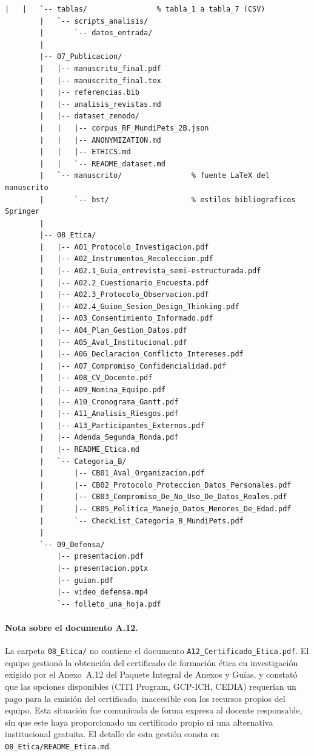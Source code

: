 \documentclass[journal,onecolumn]{IEEEtran}
\begin{document}
\begin{lstlisting}[style=csharp,caption={Estructura de carpetas del repositorio MundiPets-PFC-IngReq.},label={lst:estructura_repo}]
		|   |   `-- tablas/                % tabla_1 a tabla_7 (CSV)
		|   `-- scripts_analisis/
		|       `-- datos_entrada/
		|
		|-- 07_Publicacion/
		|   |-- manuscrito_final.pdf
		|   |-- manuscrito_final.tex
		|   |-- referencias.bib
		|   |-- analisis_revistas.md
		|   |-- dataset_zenodo/
		|   |   |-- corpus_RF_MundiPets_2B.json
		|   |   |-- ANONYMIZATION.md
		|   |   |-- ETHICS.md
		|   |   `-- README_dataset.md
		|   `-- manuscrito/                % fuente LaTeX del manuscrito
		|       `-- bst/                   % estilos bibliograficos Springer
		|
		|-- 08_Etica/
		|   |-- A01_Protocolo_Investigacion.pdf
		|   |-- A02_Instrumentos_Recoleccion.pdf
		|   |-- A02.1_Guia_entrevista_semi-estructurada.pdf
		|   |-- A02.2_Cuestionario_Encuesta.pdf
		|   |-- A02.3_Protocolo_Observacion.pdf
		|   |-- A02.4_Guion_Sesion_Design_Thinking.pdf
		|   |-- A03_Consentimiento_Informado.pdf
		|   |-- A04_Plan_Gestion_Datos.pdf
		|   |-- A05_Aval_Institucional.pdf
		|   |-- A06_Declaracion_Conflicto_Intereses.pdf
		|   |-- A07_Compromiso_Confidencialidad.pdf
		|   |-- A08_CV_Docente.pdf
		|   |-- A09_Nomina_Equipo.pdf
		|   |-- A10_Cronograma_Gantt.pdf
		|   |-- A11_Analisis_Riesgos.pdf
		|   |-- A13_Participantes_Externos.pdf
		|   |-- Adenda_Segunda_Ronda.pdf
		|   |-- README_Etica.md
		|   `-- Categoria_B/
		|       |-- CB01_Aval_Organizacion.pdf
		|       |-- CB02_Protocolo_Proteccion_Datos_Personales.pdf
		|       |-- CB03_Compromiso_De_No_Uso_De_Datos_Reales.pdf
		|       |-- CB05_Politica_Manejo_Datos_Menores_De_Edad.pdf
		|       `-- CheckList_Categoria_B_MundiPets.pdf
		|
		`-- 09_Defensa/
		    |-- presentacion.pdf
		    |-- presentacion.pptx
		    |-- guion.pdf
		    |-- video_defensa.mp4
		    `-- folleto_una_hoja.pdf
	\end{lstlisting}

	\paragraph{Nota sobre el documento A.12.}
	La carpeta \texttt{08\_Etica/} no contiene el documento
	\texttt{A12\_Certificado\_Etica.pdf}. El equipo gestionó la obtención del
	certificado de formación ética en investigación exigido por el Anexo~A.12
	del Paquete Integral de Anexos y Guías, y constató que las opciones
	disponibles (CITI Program, GCP-ICH, CEDIA) requerían un pago para la
	emisión del certificado, inaccesible con los recursos propios del equipo.
	Esta situación fue comunicada de forma expresa al docente responsable, sin
	que este haya proporcionado un certificado propio ni una alternativa
	institucional gratuita. El detalle de esta gestión consta en
	\texttt{08\_Etica/README\_Etica.md}.
	
\end{document}

